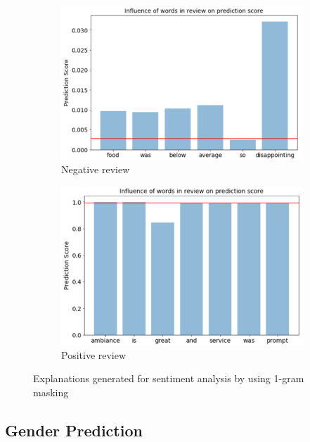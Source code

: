 \begin{figure}[t]
	\centering
	\begin{subfigure}{0.45\textwidth}
		\centering
		\includegraphics[width=\linewidth]{figure5}
		\caption{Negative review}
		\label{fig:sa:mask:neg}
	\end{subfigure} %
	\begin{subfigure}{0.45\textwidth}
		\centering
		\includegraphics[width=\linewidth]{figure4}
		\caption{Positive review}
		\label{fig:sa:mask:pos}
	\end{subfigure}
	\caption{Explanations generated for sentiment analysis by using 1-gram masking}
	\label{fig:sa:mask}
\end{figure}

\subsection{Gender Prediction}

